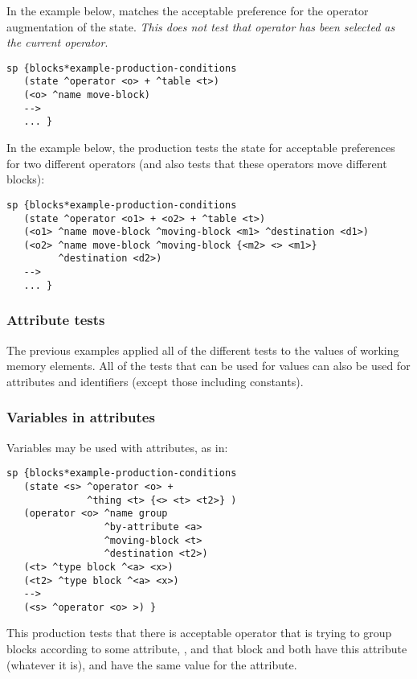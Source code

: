 In the example below,  matches the acceptable
preference for the operator augmentation of the state. \emph{This does not
test that operator}  \emph{has been selected as the current
operator}.

\begin{verbatim}
sp {blocks*example-production-conditions
   (state ^operator <o> + ^table <t>)
   (<o> ^name move-block)
   -->
   ... }
\end{verbatim}


In the example below, the production tests the state for acceptable
preferences for two different operators (and also tests that these operators
move different blocks):

\begin{verbatim}
sp {blocks*example-production-conditions
   (state ^operator <o1> + <o2> + ^table <t>)
   (<o1> ^name move-block ^moving-block <m1> ^destination <d1>)
   (<o2> ^name move-block ^moving-block {<m2> <> <m1>} 
         ^destination <d2>)
   -->
   ... }
\end{verbatim}

\subsubsection{Attribute tests}

The previous examples applied all of the different tests to the values of
working memory elements. 
All of the tests that can be used for values can also be used for
attributes and identifiers (except those including constants).

\subsubsection*{Variables in attributes}

Variables may be used with attributes, as in:

\begin{verbatim}
sp {blocks*example-production-conditions
   (state <s> ^operator <o> + 
              ^thing <t> {<> <t> <t2>} )
   (operator <o> ^name group 
                 ^by-attribute <a>
                 ^moving-block <t>
                 ^destination <t2>)
   (<t> ^type block ^<a> <x>)
   (<t2> ^type block ^<a> <x>)
   -->
   (<s> ^operator <o> >) }
\end{verbatim}

This production tests that there is acceptable operator that is trying to
group blocks according to some attribute, , and that block
 and  both have this attribute (whatever it is), and have
the same value for the attribute.


